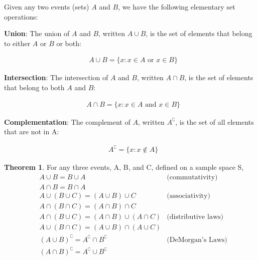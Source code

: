 \documentclass[11pt,a4paper]{report}
\theoremstyle{definition}
\theoremstyle{theorem}
\newtheorem{thm}{Theorem}[section]
\begin{document}
Given any two events (sets) $A$ and $B$, we have the following elementary set operations:

\textbf{Union}: The union of $A$ and $B$, written $A \cup B$, is the set of elements that belong to either $A$ or $B$ or both:

\begin{align*}
    & A \cup B = \{x:x \in A \textrm{ or } x \in B\}
\end{align*}

\textbf{Intersection}: The intersection of $A$ and $B$, written $A \cap B$, is the set of elements that belong to both $A$ and $B$:

\begin{align*}
    & A \cap B = \{x:x \in A \textrm{ and } x \in B\}
\end{align*}

\textbf{Complementation}: The complement of $A$, written $A^{\complement}$, is the set of all elements that are not in A:

\begin{align*}
    & A^{\complement} = \{x:x \notin A\}
\end{align*}

\begin{thm}
For any three events, A, B, and C, defined on a sample space S,
\begin{align*}
    & A \cup B = B \cup A & \textrm{(commutativity)} \\
    & A \cap B = B \cap A \\
    & A \cup (B \cup C) = (A \cup B) \cup C & \textrm{(associativity)} \\
    & A \cap (B \cap C) = (A \cap B) \cap C \\
    & A \cap (B \cup C) = (A \cap B) \cup (A \cap C) & \textrm{(distributive laws)} \\
    & A \cup (B \cap C) = (A \cup B) \cap (A \cup C) \\
    & (A \cup B)^{\complement} = A^{\complement} \cap B^{\complement} & \textrm{(DeMorgan's Laws)} \\
    & (A \cap B)^{\complement} = A^{\complement} \cup B^{\complement}
\end{align*}
\end{thm}
\end{document}
